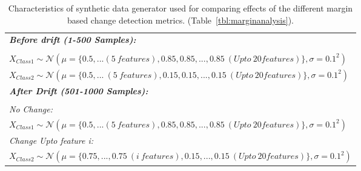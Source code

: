 \documentclass[authoryear,3p,times,twocolumn]{elsarticle}
\begin{document}
\begin{table*}[t]
\centering
\caption{Characteristics of synthetic data generator used for comparing effects of the different margin based change detection metrics. (Table~\ref{tbl:marginanalysis}). }
\label{tbl:marginsynthetic}
\begin{tabular}{|l|}
\hline

\textit{\textbf{Before drift (1-500 Samples):}} \\ \\
$
X_{Class 1}\sim \mathcal{N}(\mu= \{0.5,...(5\ features),0.85,0.85,...,0.85\ (Upto\ 20 features)\},\sigma=0.1^2)
$
\\
$
X_{Class 2}\sim \mathcal{N}(\mu= \{0.5,...\ (5\ features),0.15,0.15,...,0.15\ (Upto\ 20 features)\},\sigma=0.1^2)
$ \\
\hline

\textit{\textbf{After Drift (501-1000 Samples):}} \\ \\
\textit{No Change:} \\
$
X_{Class 1}\sim \mathcal{N}(\mu= \{0.5,...(5\ features),0.85,0.85,...,0.85\ (Upto\ 20 features)\},\sigma=0.1^2)
$
\\

\textit{Change Upto feature i:} \\
$
X_{Class 2}\sim \mathcal{N}(\mu= \{0.75,...,0.75\ (i\ features), 0.15,...,0.15\ (Upto\ 20 features)\},\sigma=0.1^2)
$ \\
\hline
\end{tabular}
\end{table*}
\end{document}
